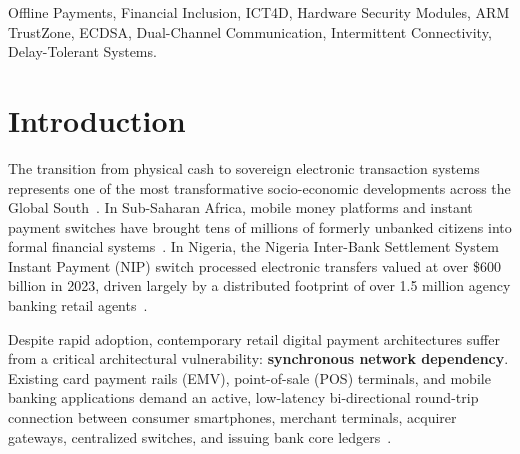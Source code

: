 \documentclass[conference]{IEEEtran}
\begin{document}
\begin{abstract}
Furthermore, ResiliPay implements an order-independent reconciliation state machine utilizing sliding replay-window nonce sets, guaranteeing that out-of-order merchant batch uploads after regional grid restoration achieve 100\% settlement precision without false replay rejections. Under a simulated post-blackout reconnection burst of 1,000 out-of-order merchant transactions with 50 injected adversarial replay attacks, ResiliPay achieves 100\% settlement precision and 100\% adversarial rejection in 176\,ms ($>$5,600 settled tx/sec). We outline a pragmatic three-tier hardware security model spanning dedicated Secure Elements, ARM TrustZone with Replay Protected Memory Blocks (RPMB), and bank-underwritten micro-floats, providing an actionable blueprint for sovereign financial resilience in infrastructure-challenged economies.
\end{abstract}

\begin{IEEEkeywords}
Offline Payments, Financial Inclusion, ICT4D, Hardware Security Modules, ARM TrustZone, ECDSA, Dual-Channel Communication, Intermittent Connectivity, Delay-Tolerant Systems.
\end{IEEEkeywords}

\section{Introduction}
The transition from physical cash to sovereign electronic transaction systems represents one of the most transformative socio-economic developments across the Global South~\cite{aker2010mobile, jack2014risk}. In Sub-Saharan Africa, mobile money platforms and instant payment switches have brought tens of millions of formerly unbanked citizens into formal financial systems~\cite{gsma2023state}. In Nigeria, the Nigeria Inter-Bank Settlement System Instant Payment (NIP) switch processed electronic transfers valued at over \$600 billion in 2023, driven largely by a distributed footprint of over 1.5 million agency banking retail agents~\cite{nibss2023annual, efina2023access}.

Despite rapid adoption, contemporary retail digital payment architectures suffer from a critical architectural vulnerability: \textbf{synchronous network dependency}. Existing card payment rails (EMV), point-of-sale (POS) terminals, and mobile banking applications demand an active, low-latency bi-directional round-trip connection between consumer smartphones, merchant terminals, acquirer gateways, centralized switches, and issuing bank core ledgers~\cite{bis2023polaris, chu2022offline}. 
\end{document}
